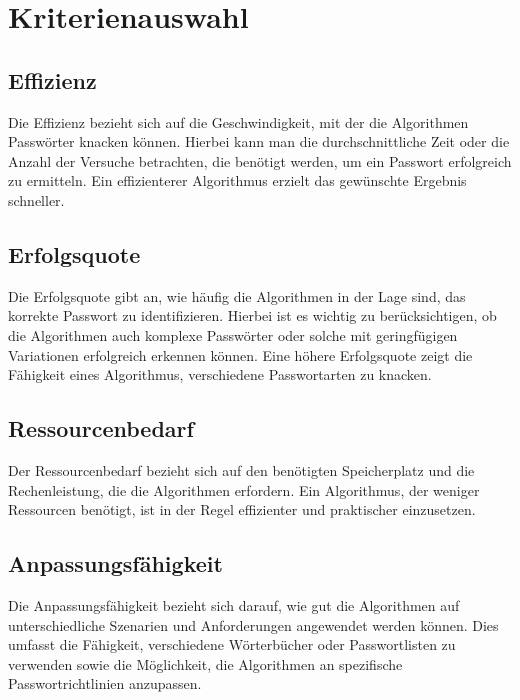\section{Kriterienauswahl}
\subsection{Effizienz}
Die Effizienz bezieht sich auf die Geschwindigkeit, mit der die Algorithmen Passwörter knacken können. 
Hierbei kann man die durchschnittliche Zeit oder die Anzahl der Versuche betrachten, die benötigt werden, um ein Passwort erfolgreich zu ermitteln. 
Ein effizienterer Algorithmus erzielt das gewünschte Ergebnis schneller.
\subsection{Erfolgsquote}
Die Erfolgsquote gibt an, wie häufig die Algorithmen in der Lage sind, das korrekte Passwort zu identifizieren. 
Hierbei ist es wichtig zu berücksichtigen, ob die Algorithmen auch komplexe Passwörter oder solche mit geringfügigen Variationen erfolgreich erkennen können. 
Eine höhere Erfolgsquote zeigt die Fähigkeit eines Algorithmus, verschiedene Passwortarten zu knacken.
\subsection{Ressourcenbedarf}
Der Ressourcenbedarf bezieht sich auf den benötigten Speicherplatz und die Rechenleistung, die die Algorithmen erfordern.
Ein Algorithmus, der weniger Ressourcen benötigt, ist in der Regel effizienter und praktischer einzusetzen.
\subsection{Anpassungsfähigkeit}
Die Anpassungsfähigkeit bezieht sich darauf, wie gut die Algorithmen auf unterschiedliche Szenarien und Anforderungen angewendet werden können. 
Dies umfasst die Fähigkeit, verschiedene Wörterbücher oder Passwortlisten zu verwenden sowie die Möglichkeit, die Algorithmen an spezifische Passwortrichtlinien anzupassen.
 
